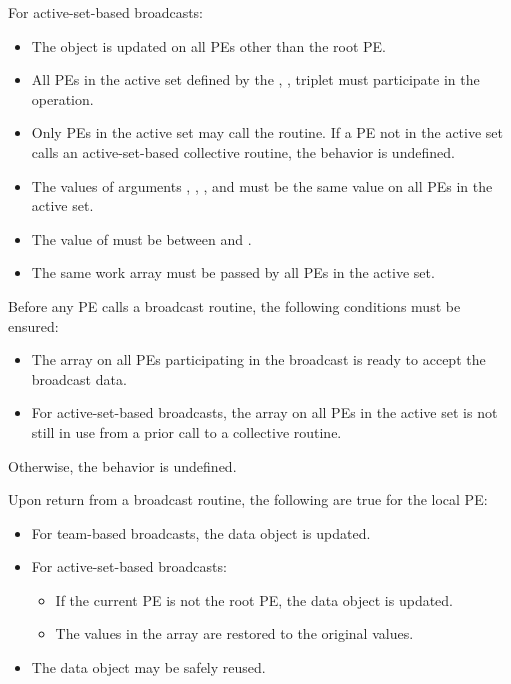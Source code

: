 \begin{apidefinition}
{    For active-set-based broadcasts:
    \begin{itemize}
    \item The \dest{} object is updated on all \acp{PE} other than the
      root \ac{PE}.
    \item All \acp{PE} in the active set defined by the
      , ,  triplet
      must participate in the operation.
    \item Only \acp{PE} in the active set may call the routine.  If a
      \ac{PE} not in the active set calls an active-set-based
      collective routine, the behavior is undefined.
    \item The values of arguments , ,
      , and  must be the same value
      on all \acp{PE} in the active set.
    \item The value of  must be between  and
      .
    \item The same  work array must be passed by all \acp{PE}
      in the active set.
    \end{itemize}

    Before any \ac{PE} calls a broadcast routine, the following
    conditions must be ensured:
    \begin{itemize}
    \item The \dest{} array on all \acp{PE} participating in the broadcast
      is ready to accept the broadcast data.
    \item For active-set-based broadcasts, the
       array on all \acp{PE} in the
      active set is not still in use from a prior call to a collective
      \openshmem routine.
    \end{itemize}
    Otherwise, the behavior is undefined.

    Upon return from a broadcast routine, the following are true for the local
    \ac{PE}:
    \begin{itemize}
    \item For team-based broadcasts, the \dest{} data object is
      updated.
    \item For active-set-based broadcasts:
      \begin{itemize}
      \item If the current \ac{PE} is not the root \ac{PE}, the
        \dest{} data object is updated.
      \item The values in the  array are restored to the
        original values.
      \end{itemize}
    \item The \source{} data object may be safely reused.
    \end{itemize}
}


\end{apidefinition}

